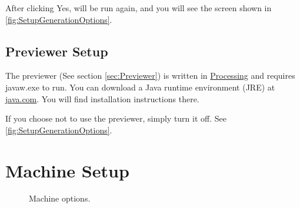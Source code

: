 \documentclass[11pt]{book}
\begin{document}
After clicking Yes,  will be run again, and you will see the screen shown in \figurename \vref{fig:SetupGenerationOptions}.

\subsection{Previewer Setup}

The previewer (See section \vref{sec:Previewer}) is written in \href{http://www.processing.org}{Processing} and requires javaw.exe to run. You can download a Java runtime environment (JRE) at \href{http://www.java.com}{java.com}. You will find installation instructions there. 

If you choose not to use the previewer, simply turn it off. See \figurename \vref{fig:SetupGenerationOptions}.



%
%
\section{Machine Setup}\label{sec:MachineSetup}

\begin{figure}
	\caption{Machine options.}
	\label{fig:SetupMachine}
\end{figure}
\end{document}
